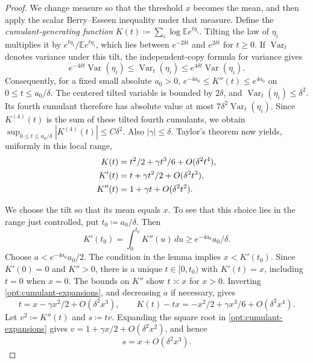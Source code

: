 \documentclass[11pt,letterpaper]{article}
\theoremstyle{remark}
\newcommand{\E}{\mathbb E}
\newcommand{\Var}{\operatorname{Var}}
\begin{document}
\begin{proof}
We change measure so that the threshold \(x\) becomes the mean, and
then apply the scalar Berry--Esseen inequality under that measure.
Define the \emph{cumulant-generating function}
\(K(t)\coloneqq\sum_i\log\E e^{t\eta_i}\). Tilting the law of
\(\eta_i\) multiplies it by \(e^{t\eta_i}/\E e^{t\eta_i}\), which
lies between \(e^{-2\delta t}\) and \(e^{2\delta t}\) for \(t\ge0\).
If \(\Var_t\) denotes variance
under this tilt, the independent-copy formula for variance gives
\[
 e^{-4\delta t}\Var(\eta_i)
 \le\Var_t(\eta_i)\le e^{4\delta t}\Var(\eta_i).
\]
Consequently, for a fixed small absolute \(a_0>0\),
\(e^{-4a_0}\le K''(t)\le e^{4a_0}\) on
\(0\le t\le a_0/\delta\). The centered tilted variable is bounded by
\(2\delta\), and \(\Var_t(\eta_i)\le\delta^2\). Its fourth cumulant
therefore has absolute value at most
\(7\delta^2\Var_t(\eta_i)\). Since \(K^{(4)}(t)\) is the sum of
these tilted fourth cumulants, we obtain
\(\sup_{0\le t\le a_0/\delta}|K^{(4)}(t)|\le C\delta^2\).
Also \(|\gamma|\le\delta\). Taylor's theorem now yields, uniformly in
this local range,
\begin{align}
 K(t)&=t^2/2+\gamma t^3/6+O(\delta^2t^4),\notag\\
 K'(t)&=t+\gamma t^2/2+O(\delta^2t^3),\notag\\
 K''(t)&=1+\gamma t+O(\delta^2t^2).
 \label{opt:cumulant-expansions}
\end{align}

We choose the tilt so that its mean equals \(x\). To see that this
choice lies in the range just controlled, put \(t_0\coloneqq a_0/\delta\).
Then
\[
 K'(t_0)=\int_0^{t_0}K''(u)\,du
 \ge e^{-4a_0}a_0/\delta.
\]
Choose \(a<e^{-4a_0}a_0/2\). The condition in the lemma implies
\(x<K'(t_0)\). Since \(K'(0)=0\) and \(K''>0\), there is a unique
\(t\in[0,t_0)\) with \(K'(t)=x\), including \(t=0\) when \(x=0\).
The bounds on \(K''\) show \(t\asymp x\) for \(x>0\).
Inverting \eqref{opt:cumulant-expansions}, and decreasing \(a\) if
necessary, gives
\begin{equation}
 t=x-\gamma x^2/2+O(\delta^2x^3),\qquad
 K(t)-tx=-x^2/2+\gamma x^3/6+O(\delta^2x^4).
 \label{opt:tilt-root}
\end{equation}
Let \(v^2\coloneqq K''(t)\) and \(s\coloneqq tv\). Expanding the square root in
\eqref{opt:cumulant-expansions} gives
\(v=1+\gamma x/2+O(\delta^2x^2)\), and hence
\begin{equation}
 s=x+O(\delta^2x^3).
 \label{opt:tilted-scale}
\end{equation}


\end{proof}
\end{document}
